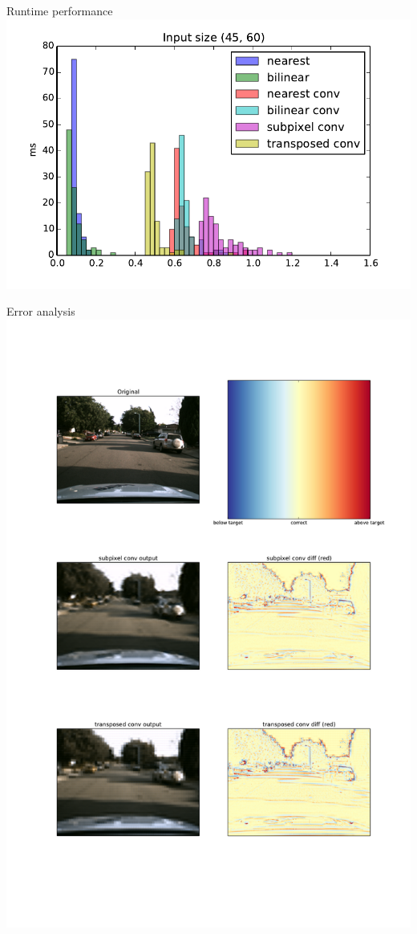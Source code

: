 \documentclass[]{beamer}
\begin{document}
\begin{frame}{Runtime performance}
\includegraphics[width=1.0\textwidth]{figures/small-runtime-histogram}
\end{frame}

\begin{frame}{Error analysis}
\includegraphics[height=1.0\textheight,width=1.0\textwidth]{figures/error-analysis}
\end{frame}
\end{document}
